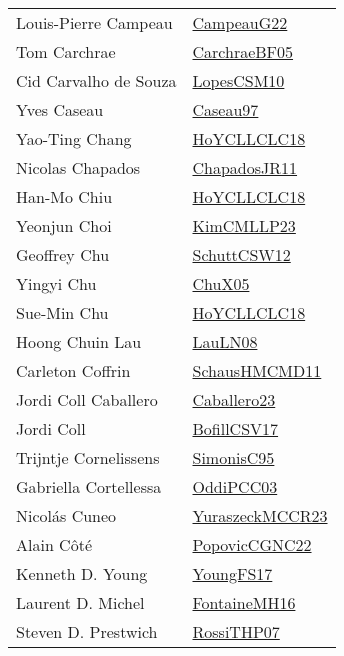 {\begin{longtable}{p{4cm}p{20cm}}
Louis{-}Pierre Campeau & \href{articles/CampeauG22.pdf}{CampeauG22}\cite{CampeauG22} \\
Tom Carchrae & \href{papers/CarchraeBF05.pdf}{CarchraeBF05}\cite{CarchraeBF05} \\
Cid Carvalho de Souza & \href{articles/LopesCSM10.pdf}{LopesCSM10}\cite{LopesCSM10} \\
Yves Caseau & \href{papers/Caseau97.pdf}{Caseau97}\cite{Caseau97} \\
Yao{-}Ting Chang & \href{}{HoYCLLCLC18}\cite{HoYCLLCLC18} \\
Nicolas Chapados & \href{papers/ChapadosJR11.pdf}{ChapadosJR11}\cite{ChapadosJR11} \\
Han{-}Mo Chiu & \href{}{HoYCLLCLC18}\cite{HoYCLLCLC18} \\
Yeonjun Choi & \href{papers/KimCMLLP23.pdf}{KimCMLLP23}\cite{KimCMLLP23} \\
Geoffrey Chu & \href{papers/SchuttCSW12.pdf}{SchuttCSW12}\cite{SchuttCSW12} \\
Yingyi Chu & \href{papers/ChuX05.pdf}{ChuX05}\cite{ChuX05} \\
Sue{-}Min Chu & \href{}{HoYCLLCLC18}\cite{HoYCLLCLC18} \\
Hoong Chuin Lau & \href{papers/LauLN08.pdf}{LauLN08}\cite{LauLN08} \\
Carleton Coffrin & \href{articles/SchausHMCMD11.pdf}{SchausHMCMD11}\cite{SchausHMCMD11} \\
Jordi Coll Caballero & \href{articles/Caballero23.pdf}{Caballero23}\cite{Caballero23} \\
Jordi Coll & \href{papers/BofillCSV17.pdf}{BofillCSV17}\cite{BofillCSV17} \\
Trijntje Cornelissens & \href{papers/SimonisC95.pdf}{SimonisC95}\cite{SimonisC95} \\
Gabriella Cortellessa & \href{papers/OddiPCC03.pdf}{OddiPCC03}\cite{OddiPCC03} \\
Nicol{\'{a}}s Cuneo & \href{articles/YuraszeckMCCR23.pdf}{YuraszeckMCCR23}\cite{YuraszeckMCCR23} \\
Alain C{\^{o}}t{\'{e}} & \href{papers/PopovicCGNC22.pdf}{PopovicCGNC22}\cite{PopovicCGNC22} \\
Kenneth D. Young & \href{papers/YoungFS17.pdf}{YoungFS17}\cite{YoungFS17} \\
Laurent D. Michel & \href{papers/FontaineMH16.pdf}{FontaineMH16}\cite{FontaineMH16} \\
Steven D. Prestwich & \href{papers/RossiTHP07.pdf}{RossiTHP07}\cite{RossiTHP07} \\

\end{longtable}}
